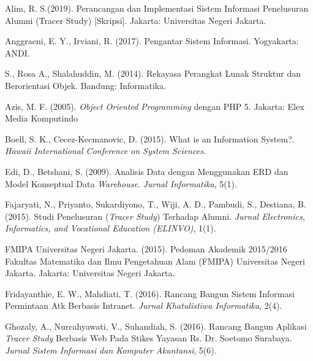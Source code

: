 \documentclass{jtetiskripsi}
\begin{document}
%
\begin{thebibliography}{99}
	
 Alim, R. S.(2019). Perancangan dan Implementasi Sistem Informasi Penelusuran Alumni (Tracer Study) [Skripsi]. Jakarta: Universitas Negeri Jakarta.

 Anggraeni, E. Y., Irviani, R. (2017). Pengantar Sistem Informasi. Yogyakarta: ANDI.

 S., Rosa A., Shalahuddin, M. (2014). Rekayasa Perangkat Lunak Struktur dan Berorientasi Objek. Bandung: Informatika.

 Azis, M. F. (2005). \textit{Object Oriented Programming} dengan PHP 5. Jakarta: Elex Media Komputindo

 Boell, S. K., Cecez-Kecmanovic, D. (2015). What is an Information System?. \textit{Hawaii International Conference on System Sciences}.

 Edi, D., Betshani, S. (2009). Analisis Data dengan Menggunakan ERD dan Model Konseptual Data \textit{Warehouse}. \textit{Jurnal Informatika}, 5(1).

 Fajaryati, N., Priyanto, Sukardiyono, T., Wiji, A. D., Pambudi, S., Destiana, B. (2015). Studi Penelusuran (\textit{Tracer Study}) Terhadap Alumni. \textit{Jurnal Electronics, Informatics, and Vocational Education (ELINVO)}, 1(1).

 FMIPA Universitas Negeri Jakarta. (2015). Pedoman Akademik 2015/2016 Fakultas Matematika dan Ilmu Pengetahuan Alam (FMIPA) Universitas Negeri Jakarta. Jakarta: Universitas Negeri Jakarta.

 Fridayanthie, E. W., Mahdiati, T. (2016). Rancang Bangun Sistem Informasi Permintaan Atk Berbasis Intranet. \textit{Jurnal Khatulistiwa Informatika}, 2(4).

 Ghozaly, A., Nurcahyawati, V., Suhandiah, S. (2016). Rancang Bangun Aplikasi \textit{Tracer Study} Berbasis Web Pada Stikes Yayasan Rs. Dr. Soetomo Surabaya. \textit{Jurnal Sistem Informasi dan Komputer Akuntansi}, 5(6).


\end{thebibliography}
\end{document}

